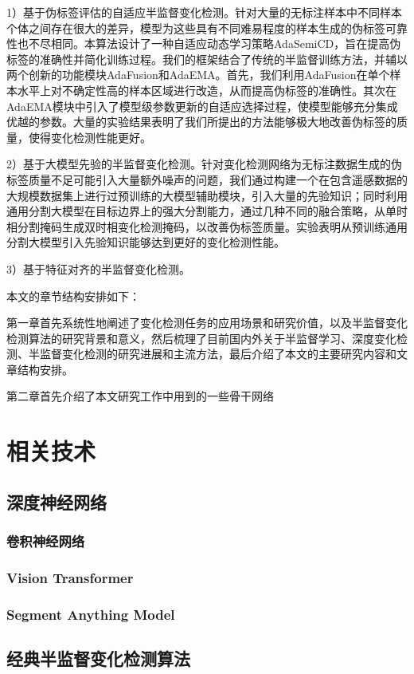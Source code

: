 \documentclass[lang=chs, degree=master, blindreview=false, adobe=false]{yanputhesis}
\begin{document}
1）基于伪标签评估的自适应半监督变化检测。针对大量的无标注样本中不同样本个体之间存在很大的差异，模型为这些具有不同难易程度的样本生成的伪标签可靠性也不尽相同。本算法设计了一种自适应动态学习策略AdaSemiCD，旨在提高伪标签的准确性并简化训练过程。我们的框架结合了传统的半监督训练方法，并辅以两个创新的功能模块AdaFusion和AdaEMA。首先，我们利用AdaFusion在单个样本水平上对不确定性高的样本区域进行改造，从而提高伪标签的准确性。其次在AdaEMA模块中引入了模型级参数更新的自适应选择过程，使模型能够充分集成优越的参数。大量的实验结果表明了我们所提出的方法能够极大地改善伪标签的质量，使得变化检测性能更好。

2）基于大模型先验的半监督变化检测。针对变化检测网络为无标注数据生成的伪标签质量不足可能引入大量额外噪声的问题，我们通过构建一个在包含遥感数据的大规模数据集上进行过预训练的大模型辅助模块，引入大量的先验知识；同时利用通用分割大模型在目标边界上的强大分割能力，通过几种不同的融合策略，从单时相分割掩码生成双时相变化检测掩码，以改善伪标签质量。实验表明从预训练通用分割大模型引入先验知识能够达到更好的变化检测性能。

3）基于特征对齐的半监督变化检测。

本文的章节结构安排如下：

第一章首先系统性地阐述了变化检测任务的应用场景和研究价值，以及半监督变化检测算法的研究背景和意义，然后梳理了目前国内外关于半监督学习、深度变化检测、半监督变化检测的研究进展和主流方法，最后介绍了本文的主要研究内容和文章结构安排。

第二章首先介绍了本文研究工作中用到的一些骨干网络
\chapter{相关技术}
\section{深度神经网络}
\subsection{卷积神经网络}
\subsection{Vision Transformer}
\subsection{Segment Anything Model}
\section{经典半监督变化检测算法}
\end{document}
